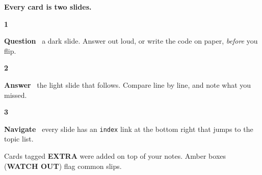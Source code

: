 \documentclass[aspectratio=1610,11pt]{beamer}
\newcommand{\mutedc}{mutedb}
\newcommand{\figc}{accd}
\newcommand{\codecolor}{accd}
\begin{document}
{
\renewcommand{\mutedc}{mutedf}\renewcommand{\figc}{acc}\renewcommand{\codecolor}{acc}
\begin{frame}[plain,c]
\par\vspace{4mm}
{\fontsize{24}{29}\selectfont\bfseries\color{snow}Every card is two slides.}\par\vspace{6mm}
\begin{minipage}[t]{0.31\textwidth}\raggedright
{\fontsize{26}{28}\selectfont\bfseries\color{acc}1}\par\vspace{1mm}
\textbf{Question} \textemdash\ a dark slide. Answer out loud, or write the code on paper, \emph{before} you flip.
\end{minipage}\hfill
\begin{minipage}[t]{0.31\textwidth}\raggedright
{\fontsize{26}{28}\selectfont\bfseries\color{acc}2}\par\vspace{1mm}
\textbf{Answer} \textemdash\ the light slide that follows. Compare line by line, and note what you missed.
\end{minipage}\hfill
\begin{minipage}[t]{0.31\textwidth}\raggedright
{\fontsize{26}{28}\selectfont\bfseries\color{acc}3}\par\vspace{1mm}
\textbf{Navigate} \textemdash\ every slide has an \texttt{index} link at the bottom right that jumps to the topic list.
\end{minipage}\par\vspace{7mm}
{\fontsize{10}{14}\selectfont\color{mutedf}Cards tagged \textbf{EXTRA} were added on top of your notes. Amber boxes (\textbf{WATCH OUT}) flag common slips.}
\end{frame}
}
\end{document}
